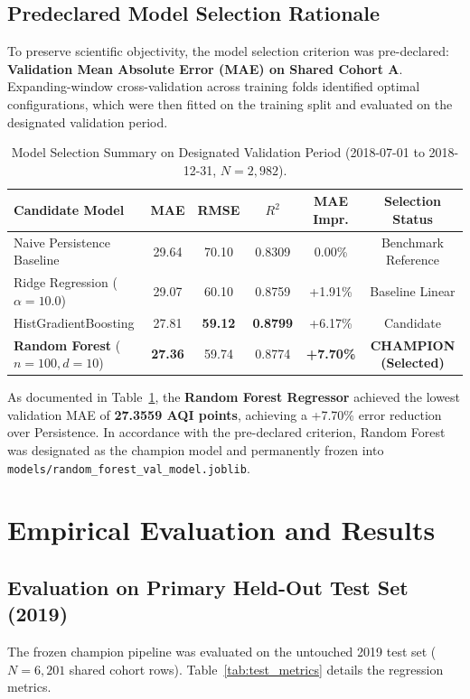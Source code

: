 \documentclass[11pt,a4paper]{report}
\begin{document}
\section{Predeclared Model Selection Rationale}
To preserve scientific objectivity, the model selection criterion was pre-declared: \textbf{Validation Mean Absolute Error (MAE) on Shared Cohort A}. Expanding-window cross-validation across training folds identified optimal configurations, which were then fitted on the training split and evaluated on the designated validation period.

\begin{table}[htbp]
\centering
\small
\caption{Model Selection Summary on Designated Validation Period (2018-07-01 to 2018-12-31, $N=2,982$).}
\label{tab:selection}
\begin{tabularx}{\textwidth}{>{\raggedright\arraybackslash}Xccccc}
\toprule
\textbf{Candidate Model} & \textbf{MAE} & \textbf{RMSE} & \textbf{$R^2$} & \textbf{MAE Impr.} & \textbf{Selection Status} \\
\midrule
Naive Persistence Baseline & 29.64 & 70.10 & 0.8309 & 0.00\% & Benchmark Reference \\
Ridge Regression ($\alpha=10.0$) & 29.07 & 60.10 & 0.8759 & +1.91\% & Baseline Linear \\
HistGradientBoosting & 27.81 & \textbf{59.12} & \textbf{0.8799} & +6.17\% & Candidate \\
\textbf{Random Forest} ($n=100, d=10$) & \textbf{27.36} & 59.74 & 0.8774 & \textbf{+7.70\%} & \textbf{CHAMPION (Selected)} \\
\bottomrule
\end{tabularx}
\end{table}

As documented in Table~\ref{tab:selection}, the \textbf{Random Forest Regressor} achieved the lowest validation MAE of \textbf{27.3559 AQI points}, achieving a +7.70\% error reduction over Persistence. In accordance with the pre-declared criterion, Random Forest was designated as the champion model and permanently frozen into \texttt{models/random\_forest\_val\_model.joblib}.


\chapter{Empirical Evaluation and Results}

\section{Evaluation on Primary Held-Out Test Set (2019)}
The frozen champion pipeline was evaluated on the untouched 2019 test set ($N=6,201$ shared cohort rows). Table~\ref{tab:test_metrics} details the regression metrics.
\end{document}
